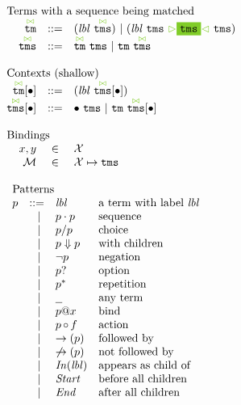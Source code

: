 \documentclass{article}
\makeatletter
\newcommand{\cursorColor}{LimeGreen}
\newcommand{\lbl}{\ensuremath{\mathit{lbl}}}
\newcommand{\tm}{\ensuremath{\mathtt{tm}}}
\newcommand{\tms}{\ensuremath{\mathtt{tms}}}
\newcommand{\Tmc}{\ensuremath{\overset{ \textcolor{\cursorColor}{\bowtie}}{\tm}}}
\newcommand{\Tmcs}{\ensuremath{\overset{\textcolor{\cursorColor}{\bowtie}}{\tms}}}
\newcommand{\mstart}{\ensuremath{\textcolor{\cursorColor}{\rhd}}}
\newcommand{\mend}{\ensuremath{\textcolor{\cursorColor}{\lhd}}}
\newcommand{\bindings}{\ensuremath{\mathcal{M}}}
\newcommand{\select}[1]{\mstart\colorbox{\cursorColor}{$#1$}\mend}
\newcommand{\pseq}[2]{\ensuremath{#1 \cdot #2}}
\newcommand{\por}[2]{\ensuremath{#1/#2}}
\newcommand{\children}[2]{\ensuremath{#1} \Downarrow #2}
\newcommand{\pnot}[1]{\ensuremath{\lnot #1}}
\newcommand{\maybe}[1]{\ensuremath{#1?}}
\newcommand{\many}[1]{\ensuremath{#1^*}}
\newcommand{\any}{\ensuremath{\text{\underline{\hspace{0.6em}}}}}
\newcommand{\bind}[2]{\ensuremath{#1@#2}}
\newcommand{\paction}[2]{\ensuremath{#1\mathop{\circ} #2}}
\newcommand{\fb}[1]{\ensuremath{\rightarrow(#1)}}
\newcommand{\nfb}[1]{\ensuremath{\not\rightarrow(#1)}}
\newcommand{\pin}[1]{\ensuremath{\mathit{In}(#1)}}
\newcommand{\pstart}{\ensuremath{\mathit{Start}}}
\newcommand{\pend}{\ensuremath{\mathit{End}}}
\newcommand{\arrayheading}[2]{\multicolumn{#1}{l}{\mbox{#2}}}
\makeatother
\begin{document}
\[
  \begin{array}{rcl}
    \arrayheading{3}{Terms with a sequence being matched}\\
    \Tmc & ::= & (\lbl~\Tmcs) ~|~ (\lbl~\tms~\select{\tms}~\tms)\\
    \Tmcs & ::= & \Tmc ~ \tms ~|~ \tm ~ \Tmcs\\
    \\
    \arrayheading{3}{Contexts (shallow)}\\
    \Tmc[\bullet] & ::= & (\lbl~\Tmcs[\bullet])\\
    \Tmcs[\bullet] & ::= & \bullet ~ \tms ~|~ \tm ~ \Tmcs[\bullet]\\
    \\
    \arrayheading{3}{Bindings}\\
    x, y      & \in & \mathcal{X}\\
    \bindings & \in & \mathcal{X} \mapsto \tms\\
    \\
    \multicolumn{3}{l}{
    \begin{array}{crll}
      \arrayheading{4}{Patterns}\\
      p & ::= & \lbl & \text{a term with label $\lbl$}\\
        & ~|~ & \pseq{p}{p} & \text{sequence}\\
        & ~|~ & \por{p}{p} & \text{choice}\\
        & ~|~ & \children{p}{p} & \text{with children}\\
        & ~|~ & \pnot{p} & \text{negation}\\
        & ~|~ & \maybe{p} & \text{option}\\
        & ~|~ & \many{p} & \text{repetition}\\
        & ~|~ & \any{} & \text{any term}\\
        & ~|~ & \bind{p}{x} & \text{bind}\\
        & ~|~ & \paction{p}{f} & \text{action}\\
        & ~|~ & \fb{p} & \text{followed by}\\
        & ~|~ & \nfb{p} & \text{not followed by}\\
        & ~|~ & \pin{\lbl} & \text{appears as child of}\\
        & ~|~ & \pstart{} & \text{before all children}\\
        & ~|~ & \pend{} & \text{after all children}\\
    \end{array}
    }\\
  \end{array}
\]
\end{document}
